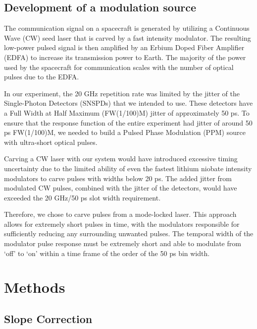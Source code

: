\documentclass[11pt]{caltech_thesis} %
\begin{document}
\hypertarget{development-of-a-modulation-source-1}{%
\subsection{Development of a modulation
source}\label{development-of-a-modulation-source-1}}

The communication signal on a spacecraft is generated by utilizing a
Continuous Wave (CW) seed laser that is carved by a fast intensity
modulator. The resulting low-power pulsed signal is then amplified by an
Erbium Doped Fiber Amplifier (EDFA) to increase its transmission power
to Earth. The majority of the power used by the spacecraft for
communication scales with the number of optical pulses due to the EDFA.

In our experiment, the 20 GHz repetition rate was limited by the jitter
of the Single-Photon Detectors (SNSPDs) that we intended to use. These
detectors have a Full Width at Half Maximum (FW(1/100)M) jitter of
approximately 50 ps. To ensure that the response function of the entire
experiment had jitter of around 50 ps FW(1/100)M, we needed to build a
Pulsed Phase Modulation (PPM) source with ultra-short optical pulses.

Carving a CW laser with our system would have introduced excessive
timing uncertainty due to the limited ability of even the fastest
lithium niobate intensity modulators to carve pulses with widths below
20 ps. The added jitter from modulated CW pulses, combined with the
jitter of the detectors, would have exceeded the 20 GHz/50 ps slot width
requirement.

Therefore, we chose to carve pulses from a mode-locked laser. This
approach allows for extremely short pulses in time, with the modulators
responsible for sufficiently reducing any surrounding unwanted pulses.
The temporal width of the modulator pulse response must be extremely
short and able to modulate from `off' to `on' within a time frame of the
order of the 50 ps bin width.

\hypertarget{methods-1}{%
\section{Methods}\label{methods-1}}

\hypertarget{slope-correction}{%
\subsection{Slope Correction}\label{slope-correction}}
\end{document}
